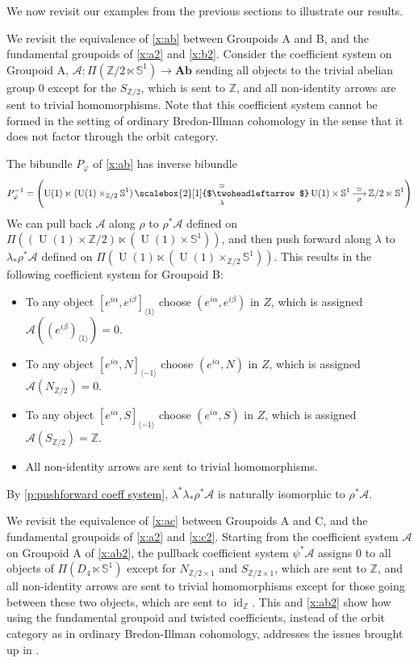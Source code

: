 \documentclass[12pt,reqno]{amsart}
\newcommand{\printname}[1]{}
\renewcommand{\printname}[1]
	{{\color{brown}{\makebox[0pt]{\hspace{-1in}\raisebox{8pt}{\tiny #1}}}}}
\newcommand{\labell}[1]{\label{#1} \printname{#1}}
\newcommand{\calA}{{\mathcal{A}}}
\renewcommand{\SS}{{\mathbb{S}}} %
\newcommand{\ZZ}{{\mathbb{Z}}}  %
\newcommand{\Ab}{{\mathbf{Ab}}} %
\newcommand{\id}{{\operatorname{id}}}  %
\newcommand{\U}{{\operatorname{U}}}  %
\newcommand{\ot}[1]{{\,\underset{\raisebox{1mm}{$\scriptstyle{#1}$}}{\overset{\simeq}{\scalebox{2}[1]{$\twoheadleftarrow$}}}\,}} %
\newcommand{\uto}[1]{{\,\underset{\raisebox{1mm}{$\scriptstyle{#1}$}}{\longrightarrow}\,}} %
\theoremstyle{plain}
\theoremstyle{definition}
\newenvironment{example}
		{\pushQED{\qed}\renewcommand{\qedsymbol}{$/\!\!/$}\examplex}
		{\popQED\endexamplex}
\begin{document}
   We now revisit our  examples from the previous sections to illustrate our results.  

    \begin{example}\labell{x:ab2}
        We revisit the equivalence of \cref{x:ab} between Groupoids A and B,  and the fundamental groupoids of \cref{x:a2} and \cref{x:b2}.  Consider the coefficient system on Groupoid A,  $\calA\colon\Pi(\ZZ/2\ltimes\SS^1)\to\Ab$ sending all objects to the trivial abelian group $0$ except for the $S_{\ZZ/2}$, which is sent to $\ZZ$, and all non-identity arrows are sent to trivial homomorphisms.  Note that this coefficient system cannot be formed in the setting of ordinary Bredon-Illman cohomology in the sense that it does not factor through the orbit category.

        The bibundle $P_\varphi$ of \cref{x:ab} has inverse bibundle 
        $$P_\varphi^{-1}=\left(\U(1)\ltimes (\U(1)\times_{\ZZ/2}\SS^1)\ot{\lambda}\U(1)\times\SS^1\overset{\simeq}{\uto{\rho}}\ZZ/2\ltimes \SS^1\right)$$  We can pull back $\calA$  along $\rho$ to $\rho^*\calA$ defined on $\Pi\left((\U(1)\times\ZZ/2)\ltimes(\U(1)\times\SS^1)\right)$, and then push forward along $\lambda$ to $\lambda_*\rho^*\calA$ defined on $\Pi\left(\U(1)\ltimes (\U(1)\times_{\ZZ/2}\SS^1)\right)$.   This results in the following coefficient system for Groupoid B:
        \begin{itemize}
            \item To any object $[e^{i\alpha},e^{i\beta}]_{\langle1\rangle}$ choose $(e^{i\alpha},e^{i\beta})$ in $Z$, which is assigned $\calA((e^{i\beta})_{\langle1\rangle})=0$.
            \item To any object $[e^{i\alpha},N]_{\langle-1\rangle}$ choose $(e^{i\alpha},N)$ in $Z$, which is assigned $\calA(N_{\ZZ/2})=0$.
            \item To any object $[e^{i\alpha},S]_{\langle-1\rangle}$ choose $(e^{i\alpha},S)$ in $Z$, which is assigned $\calA(S_{\ZZ/2})=\ZZ$.
            \item All non-identity arrows are sent to trivial homomorphisms.
        \end{itemize}
        By \cref{p:pushforward coeff system}, $\lambda^*\lambda_*\rho^*\calA$ is naturally isomorphic to $\rho^*\calA$.
    \end{example}

    \begin{example}\labell{x:ac2}
        We revisit the equivalence of \cref{x:ac} between Groupoids A and C, and the fundamental groupoids of \cref{x:a2} and \cref{x:c2}.  Starting from the coefficient system $\calA$ on Groupoid A of  \cref{x:ab2},  the pullback coefficient system $\psi^*\calA$ assigns $0$ to all objects of $\Pi(D_4\ltimes\SS^1)$ except for $N_{\ZZ/2\times 1}$ and $S_{\ZZ/2\times 1}$, which are sent to $\ZZ$, and all  non-identity arrows are sent to trivial homomorphisms except for those going between these two objects, which are sent to $\id_\ZZ$.  This and \cref{x:ab2} show how using the fundamental groupoid and twisted coefficients, instead of the orbit category as in ordinary Bredon-Illman cohomology, addresses the issues brought up in \cite[Example 5.3]{PS:translation}.
    \end{example}
\end{document}

